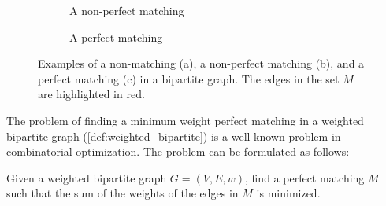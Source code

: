 \begin{example}
\begin{figure}[H]
\begin{subfigure}[b]{0.3\textwidth}
            \caption{A non-perfect matching}
            \label{fig:non_perfect_matching_style2}
        \end{subfigure}
        \hfill
        \begin{subfigure}[b]{0.3\textwidth}
            \centering
            \caption{A perfect matching}
            \label{fig:perfect_matching_style2}
        \end{subfigure}
        \caption{Examples of a non-matching (a), a non-perfect matching (b), and a perfect matching (c) in a bipartite graph. The edges in the set $M$ are highlighted in red.}
        \label{fig:matching_examples_style2}
    \end{figure}
\end{example}

The problem of finding a minimum weight perfect matching in a weighted bipartite graph (\cref{def:weighted_bipartite}) is a well-known problem in combinatorial optimization. The problem can be formulated as follows: 

\begin{definition} \label{def:mwpbm}
    Given a weighted bipartite graph $G = (V, E, w)$, find a perfect matching $M$ such that the sum of the weights of the edges in $M$ is minimized.
\end{definition}

